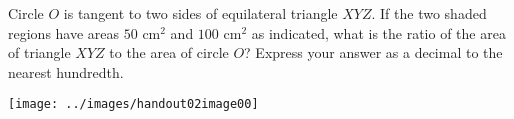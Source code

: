 Circle $O$ is tangent to two sides of equilateral triangle $XYZ$. If the two shaded regions have areas $50\text{ cm}^2$ and $100\text{ cm}^2$ as indicated, what is the ratio of the area of triangle $XYZ$ to the area of circle $O$? Express your answer as a decimal to the nearest hundredth.
\begin{center}
	\texttt{[image: ../images/handout02image00]}
\end{center}